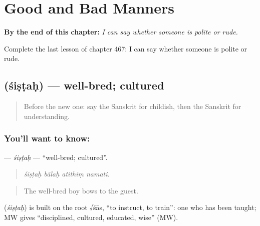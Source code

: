 
\chapter{Good and Bad Manners}
\label{ch:sa-good-and-bad-manners}

\begin{chapteropening}
\textbf{By the end of this chapter:} \emph{I can say whether someone is polite or rude.}

Complete the last lesson of chapter 467: I can say whether someone is polite or rude.
\end{chapteropening}

\section[\texorpdfstring{\sk{शिष्टः} (śiṣṭaḥ)}{शिष्टः (śiṣṭaḥ)}]{ (śiṣṭaḥ) — well-bred; cultured}

\label{lesson:SA-C467-sistah}



\begin{quote}
Before the new one: say the Sanskrit for childish, then the Sanskrit for understanding.
\end{quote}

\subsection*{You'll want to know: }
\textbf{} — \emph{śiṣṭaḥ} — \textquotedblleft{}well-bred; cultured\textquotedblright{}.

\begin{quote}
   
\end{quote}

\begin{quote}
\emph{śiṣṭaḥ bālaḥ atithiṃ namati.}
\end{quote}

\begin{quote}
The well-bred boy bows to the guest.
\end{quote}

\begin{cousinweb}
\textbf{} (\emph{śiṣṭaḥ}) is built on the root √śās, \textquotedblleft{}to instruct, to train\textquotedblright{}: one who has been taught; MW gives \textquotedblleft{}disciplined, cultured, educated, wise\textquotedblright{} (MW).
\end{cousinweb}

